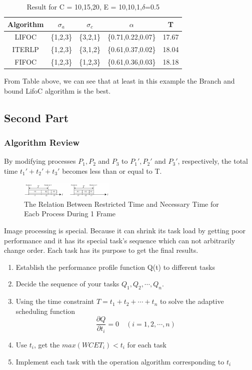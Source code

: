 \documentclass[twocolumn]{article}
\begin{document}
\begin{table}[h!]
\centering
\begin{tabular}{ ccccc } 
 \hline
 Algorithm & $\sigma_a$ & $\sigma_c$ & $\alpha$ & T\\ 
  \hline
LIFOC&	\{1,2,3\}&	\{3,2,1\}&	\{0.71,0.22,0.07\}&	17.67 \\
ITERLP&	\{1,2,3\}&	\{3,1,2\}&	\{0.61,0.37,0.02\}&	18.04\\ 
FIFOC&\{1,2,3\}&	\{1,2,3\}&	\{0.61,0.36,0.03\}&	18.18\\ 
 \hline
\end{tabular}
\caption{Result for C = {10,15,20}, E = {10,10,1},$\delta$=0.5}
\end{table}
From Table above, we can see that at least in this example the Branch and bound LifoC algorithm is the best.







\subsection{Second Part}
\subsubsection{Algorithm Review}
By modifying processes $P_1,P_2$ and $P_3$ to $P_1',P_2'$ and $P_3'$, respectively, the total time $t_1'+t_2'+t_3'$ becomes less than or equal to T\cite{Anytime}\relax.


\begin{figure}[H]
\centering
  \includegraphics[width=0.4\textwidth]{rel.jpg}
\caption{The Relation Between Restricted Time and Necessary Time for Eacb Process During 1 Frame}
\end{figure}

Image processing is special. Because it can shrink its task load by getting poor performance and it has its special task's sequence which can not arbitrarily change order. Each task has its purpose to get the final results.

\begin{enumerate}[Step 1:]
\item Establish the performance profile function Q(t) to different tasks
\item Decide the sequence of your tasks $Q_1,Q_2,\cdots,Q_n$.
\item Using the time constraint $T = t_1+ t_2 +\cdots+t_n$ to solve the adaptive scheduling function
\begin{equation*}
\frac{\partial Q}{\partial t_i} = 0 \quad(i=1,2,\cdots,n)
\end{equation*}
\item Use $t_i$, get the $max(WCET_i) < t_i$ for each task
\item Implement each task with the operation algorithm corresponding to $t_i$
\end{enumerate}
\end{document}
